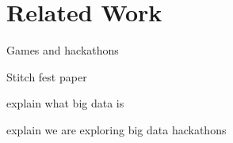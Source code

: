 \section{Related Work}


Games and hackathons


Stitch fest paper


explain what big data is


explain we are exploring big data hackathons
